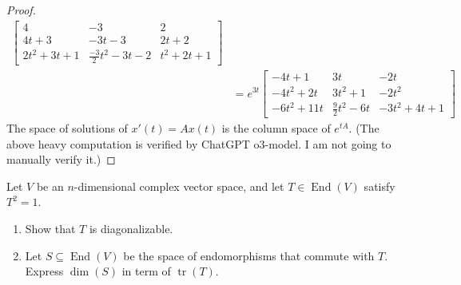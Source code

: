 \documentclass{report}
\begin{document}
\begin{proof}
\begin{align*}
\begin{bmatrix}
  4 & -3 & 2 \\
  4t+3 & -3t -3 & 2t+2 \\
  2t^2+3t +1 & \frac{-3}{2}t^2-3t-2 & t^2 +2t +1 
\end{bmatrix} \\
&=e^{3t} \begin{bmatrix}
  -4t +1 & 3t & -2t \\
  -4t^2 +2t & 3t^2 +1 & -2t^2 \\
  -6t^2 +11 t & \frac{9}{2}t^2 -6t & -3t^2 +4t +1 
\end{bmatrix}
\end{align*}
The space of solutions of $x'(t)=Ax(t)$ is the column space of $e^{tA}$. (The above heavy computation is verified by ChatGPT o3-model. I am not going to manually verify it.) 
\end{proof}
\begin{question}{}{}
Let $V$ be an  $n$-dimensional complex vector space, and let $T\in \operatorname{End}(V)$ satisfy $T^2=1$. 
 \begin{enumerate}[label=(\alph*)]
  \item Show that $T$ is diagonalizable. 
  \item Let $S\subseteq \operatorname{End}(V)$ be the space of endomorphisms that commute with $T$. Express  $\operatorname{dim}(S)$ in term of $\operatorname{tr}(T)$. 
\end{enumerate}
\end{question}
\end{document}
